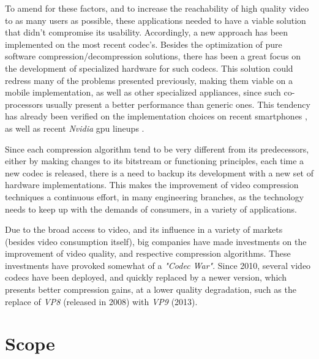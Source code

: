 To amend for these factors, and to increase the reachability of high quality video to as many users as possible, these applications needed to have a viable solution that didn't compromise its usability. Accordingly, a new approach has been implemented on the most recent codec's. Besides the optimization of pure software compression/decompression solutions, there has been a great focus on the development of specialized hardware for such codecs. This solution could redress many of the problems presented previously, making them viable on a mobile implementation, as well as other specialized appliances, since such co-processors usually present a better performance than generic ones. This tendency has already been verified on the implementation choices on recent smartphones \cite[p.~14]{scientiamobileMobileOverviewReport}, as well as recent \textit{Nvidia} \gls{gpu} lineups \cite{VideoEncodeDecode2016}.

Since each compression algorithm tend to be very different from its predecessors, either by making changes to its bitstream or functioning principles, each time a new codec is released, there is a need to backup its development with a new set of hardware implementations. This makes the improvement of video compression techniques a continuous effort, in many engineering branches, as the technology needs to keep up with the demands of consumers, in a variety of applications.

Due to the broad access to video, and its influence in a variety of markets (besides video consumption itself), big companies have made investments on the improvement of video quality, and respective compression algorithms. These investments have provoked somewhat of a \emph{"Codec War"}. Since 2010, several video codecs have been deployed, and quickly replaced by a newer version, which presents better compression gains, at a lower quality degradation, such as the replace of \textit{VP8} (released in 2008) with \textit{VP9} (2013).

\section{Scope}


